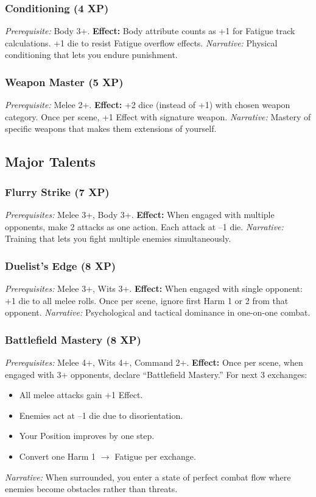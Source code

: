 \subsubsection{Conditioning (4 XP)}\label{talent:conditioning}
\textit{Prerequisite:} Body 3+.
\textbf{Effect:} Body attribute counts as +1 for Fatigue track calculations. +1 die to resist Fatigue overflow effects.
\textit{Narrative:} Physical conditioning that lets you endure punishment.

\subsubsection{Weapon Master (5 XP)}\label{talent:weapon_master}
\textit{Prerequisite:} Melee 2+.
\textbf{Effect:} +2 dice (instead of +1) with chosen weapon category. Once per scene, +1 Effect with signature weapon.
\textit{Narrative:} Mastery of specific weapons that makes them extensions of yourself.

\subsection{Major Talents}

\subsubsection{Flurry Strike (7 XP)}\label{talent:flurry_strike}
\textit{Prerequisites:} Melee 3+, Body 3+.
\textbf{Effect:} When engaged with multiple opponents, make 2 attacks as one action. Each attack at --1 die.
\textit{Narrative:} Training that lets you fight multiple enemies simultaneously.

\subsubsection{Duelist's Edge (8 XP)}\label{talent:duelist_edge}
\textit{Prerequisites:} Melee 3+, Wits 3+.
\textbf{Effect:} When engaged with single opponent: +1 die to all melee rolls. Once per scene, ignore first Harm 1 or 2 from that opponent.
\textit{Narrative:} Psychological and tactical dominance in one-on-one combat.

\subsubsection{Battlefield Mastery (8 XP)}\label{talent:battlefield_mastery}
\textit{Prerequisites:} Melee 4+, Wits 4+, Command 2+.
\textbf{Effect:} Once per scene, when engaged with 3+ opponents, declare ``Battlefield Mastery.'' For next 3 exchanges:
\begin{itemize}[nosep]
    \item All melee attacks gain +1 Effect.
    \item Enemies act at --1 die due to disorientation.
    \item Your Position improves by one step.
    \item Convert one Harm 1 $\rightarrow$ Fatigue per exchange.
\end{itemize}
\textit{Narrative:} When surrounded, you enter a state of perfect combat flow where enemies become obstacles rather than threats.

